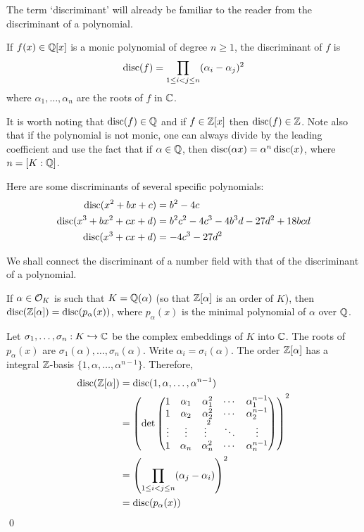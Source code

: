 The term `discriminant' will already be familiar to the reader from the discriminant of a polynomial. 


\begin{dfn}
If $f(x) \in \mathbb{Q}[x]$ is a monic polynomial of degree $n \geq 1$, the discriminant of $f$ is
	\[
	\operatorname{disc}(f)= \prod_{1 \leq i<j \leq n} (\alpha_i - \alpha_j)^2
	\]
where $\alpha_1, \ldots, \alpha_n$ are the roots of $f$ in $\mathbb{C}$. 
\end{dfn}


It is worth noting that $\operatorname{disc}(f) \in \mathbb{Q}$ and if $f \in \mathbb{Z}[x]$ then $\operatorname{disc}(f) \in \mathbb{Z}$. Note also that if the polynomial is not monic, one can always divide by the leading coefficient and use the fact that if $\alpha \in \mathbb{Q}$, then $\operatorname{disc}(\alpha x)= \alpha^n \operatorname{disc}(x)$, where $n=[K:\mathbb{Q}]$. 


\begin{ex}
Here are some discriminants of several specific polynomials:
	\[
	\begin{split}
	\operatorname{disc}(x^2 + bx + c)&= b^2 - 4c \\
	\operatorname{disc}(x^3 + bx^2 + cx + d)&= b^2c^2 - 4c^3 - 4b^3d - 27d^2 + 18bcd \\
	\operatorname{disc}(x^3 + cx + d)&= -4c^3 - 27 d^2
	\end{split}
	\] \xqed \pskip
\end{ex}


We shall connect the discriminant of a number field with that of the discriminant of a polynomial. 


\begin{lem}\label{lem:discmin}
If $\alpha \in \mathcal{O}_K$ is such that $K=\mathbb{Q}(\alpha)$ (so that $\mathbb{Z}[\alpha]$ is an order of $K$), then $\operatorname{disc}(\mathbb{Z}[\alpha])= \operatorname{disc}(p_\alpha(x))$, where $p_\alpha(x)$ is the minimal polynomial of $\alpha$ over $\mathbb{Q}$. 
\end{lem}

\pf Let $\sigma_1,\ldots,\sigma_n: K \hookrightarrow \mathbb{C}$ be the complex embeddings of $K$ into $\mathbb{C}$. The roots of $p_\alpha(x)$ are $\sigma_1(\alpha),\ldots,\sigma_n(\alpha)$. Write $\alpha_i= \sigma_i(\alpha)$. The order $\mathbb{Z}[\alpha]$ has a  integral $\mathbb{Z}$-basis $\{1,\alpha,\ldots,\alpha^{n-1}\}$. Therefore,
	\[
	\begin{split}
	\operatorname{disc}(\mathbb{Z}[\alpha])&= \operatorname{disc}(1,\alpha,\ldots,\alpha^{n-1}) \\
	&= \left( \det \begin{pmatrix}
	1 & \alpha_1 & \alpha_1^2 & \cdots & \alpha_1^{n-1} \\
	1 & \alpha_2 & \alpha_2^2 & \cdots & \alpha_2^{n-1} \\
	\vdots & \vdots & \vdots^2 & \ddots & \vdots \\
	1 & \alpha_n & \alpha_n^2 & \cdots & \alpha_n^{n-1} 
	\end{pmatrix} \right)^2 \\
	&= \left( \prod_{1 \leq i < j \leq n} (\alpha_j - \alpha_i) \right)^2 \\
	&= \operatorname{disc}(p_\alpha(x))
	\end{split}
	\] \qed \\



